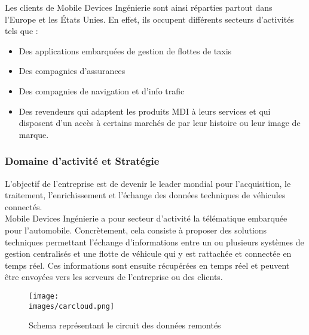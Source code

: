             
            Les clients de Mobile Devices Ingénierie sont ainsi réparties partout dans l'Europe et les États Unies. 
            En effet, ils occupent différents secteurs d’activités tels que :\\
            \begin{itemize}
                \renewcommand{\labelitemi}{$\bullet$}
                \item Des applications embarquées de gestion de flottes de taxis 
                \item Des compagnies d’assurances 
                \item Des compagnies de navigation et d'info trafic 
                \item Des revendeurs qui adaptent les produits MDI à leurs services et qui disposent d’un accès à certains marchés de par leur histoire ou leur image de marque.
            \end{itemize}


        \subsubsection{Domaine d'activité et Stratégie }
            L’objectif de l'entreprise est de devenir le leader mondial pour l'acquisition, le
            traitement, l'enrichissement et l’échange des données techniques de véhicules
            connectés.\\

            Mobile Devices Ingénierie a pour secteur d’activité la télématique embarquée pour l'automobile. 
            Concrètement, cela consiste à proposer des solutions techniques permettant l'échange d'informations 
            entre un ou plusieurs systèmes de gestion centralisés et une flotte de véhicule qui y est rattachée 
            et connectée en temps réel.
            Ces informations sont ensuite récupérées en temps réel et peuvent être envoyées 
            vers les serveurs de l’entreprise ou des clients. \\

            \begin{figure}[ht]
                \centering
                \texttt{[image: \\images/carcloud.png]}
                \caption{Schema représentant le circuit des données remontés  }
            \end{figure}
            
